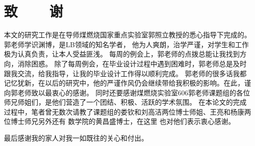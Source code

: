 %
%


%
%
\renewcommand{\baselinestretch}{1.5}
\fontsize{12pt}{13pt}\selectfont

\chapter*{致~~~~谢}

本文的研究工作是在导师煤燃烧国家重点实验室郭照立教授的悉心指导下完成的。
郭老师学识渊博，是LB领域的知名学者，
他为人爽朗，治学严谨，对学生和工作极为认真负责，让本人受益匪浅。
每周的例会上，郭老师的点拨总能让我找到方向，消除困惑。
除了每周例会，在毕业设计过程中遇到困难时，郭老师总是及时跟我交流，给我指导，让我的毕业设计工作得以顺利完成。
郭老师的很多话我都记忆犹新，在以后的研究中，他的严谨作风仍会继续带给我积极的影响。在此，谨向郭老师致以最衷心的感谢。
同时还要感谢煤燃烧实验室606郭老师课题组的各位师兄师姐们，是他们营造了一个团结、积极、活跃的学术氛围。
在本论文的完成过程中，笔者曾无数次请教了课题组的娄钦和刘高洁两位博士师姐、王亮和杨康两位博士师兄另外还有
数学院的黄昌盛博士，在这里
也对他们表示衷心感谢。

最后感谢我的家人对我一如既往的关心和付出。
